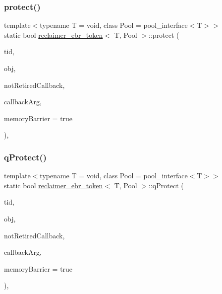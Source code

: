 \mbox{\label{classreclaimer__ebr__token_a5352c8afe5e576ab0a6370d2c3fa1752}} 
\subsubsection{\texorpdfstring{protect()}{protect()}}
{\footnotesize\ttfamily template$<$typename T  = void, class Pool  = pool\+\_\+interface$<$\+T$>$$>$ \\
static bool \hyperlink{classreclaimer__ebr__token}{reclaimer\+\_\+ebr\+\_\+token}$<$ T, Pool $>$\+::protect (\begin{DoxyParamCaption}\item[{const int}]{tid,  }\item[{T $\ast$const}]{obj,  }\item[{\hyperlink{globals_8h_a57f5c0d40b156d7d996492fb2f16e3cd}{Callback\+Type}}]{not\+Retired\+Callback,  }\item[{\hyperlink{globals_8h_a3de64ef48066ac6430631c8b81a15345}{Callback\+Arg}}]{callback\+Arg,  }\item[{bool}]{memory\+Barrier = {\ttfamily true} }\end{DoxyParamCaption})\hspace{0.3cm}{\ttfamily [inline]}, {\ttfamily [static]}}

\mbox{\label{classreclaimer__ebr__token_a894dfb4d02dc74c9d9ee23329bdce9e2}} 
\subsubsection{\texorpdfstring{q\+Protect()}{qProtect()}}
{\footnotesize\ttfamily template$<$typename T  = void, class Pool  = pool\+\_\+interface$<$\+T$>$$>$ \\
static bool \hyperlink{classreclaimer__ebr__token}{reclaimer\+\_\+ebr\+\_\+token}$<$ T, Pool $>$\+::q\+Protect (\begin{DoxyParamCaption}\item[{const int}]{tid,  }\item[{T $\ast$const}]{obj,  }\item[{\hyperlink{globals_8h_a57f5c0d40b156d7d996492fb2f16e3cd}{Callback\+Type}}]{not\+Retired\+Callback,  }\item[{\hyperlink{globals_8h_a3de64ef48066ac6430631c8b81a15345}{Callback\+Arg}}]{callback\+Arg,  }\item[{bool}]{memory\+Barrier = {\ttfamily true} }\end{DoxyParamCaption})\hspace{0.3cm}{\ttfamily [inline]}, {\ttfamily [static]}}

